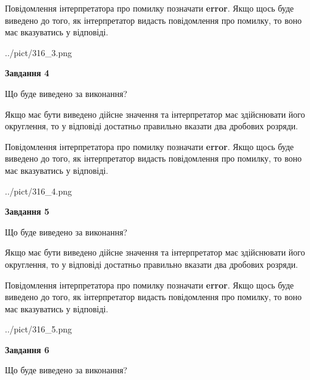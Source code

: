 \documentclass[12pt, ukrainian]{article}
\begin{document}
{\begin {Large}
Повідомлення інтерпретатора про помилку позначати \textbf{error}.
Якщо щось буде виведено до того, як інтерпретатор видасть повідомлення про помилку, 
то воно має вказуватись у відповіді. \par

\begin{center}
	{../pict/316_3.png}
\end{center}
\newpage

{\begin {center}\textbf{Завдання 4}\end {center}}\par
Що буде виведено за виконання? \par

Якщо має бути виведено дійсне значення та інтерпретатор має здійснювати його округлення, 
то у відповіді достатньо правильно вказати два дробових розряди.

Повідомлення інтерпретатора про помилку позначати \textbf{error}.
Якщо щось буде виведено до того, як інтерпретатор видасть повідомлення про помилку, 
то воно має вказуватись у відповіді. \par

\begin{center}
	{../pict/316_4.png}
\end{center}
\newpage

{\begin {center}\textbf{Завдання 5}\end {center}}\par
Що буде виведено за виконання? \par

Якщо має бути виведено дійсне значення та інтерпретатор має здійснювати його округлення, 
то у відповіді достатньо правильно вказати два дробових розряди.

Повідомлення інтерпретатора про помилку позначати \textbf{error}.
Якщо щось буде виведено до того, як інтерпретатор видасть повідомлення про помилку, 
то воно має вказуватись у відповіді. \par

\begin{center}
	{../pict/316_5.png}
\end{center}
\newpage

{\begin {center}\textbf{Завдання 6}\end {center}}\par
Що буде виведено за виконання? \par


\end{Large}}
\end{document}
